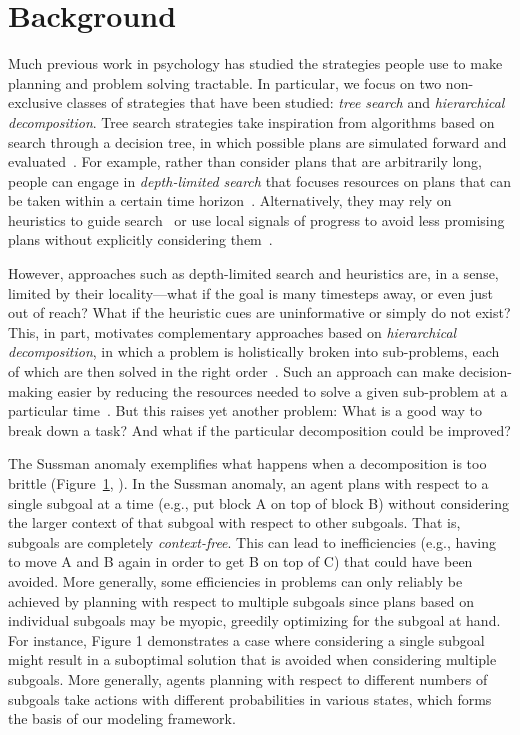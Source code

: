 \documentclass[10pt,letterpaper]{article}
\begin{document}
\section{Background}
Much previous work in psychology has studied the strategies people use to make planning and problem solving tractable. In particular, we focus on two non-exclusive classes of strategies that have been studied: \textit{tree search} and \textit{hierarchical decomposition}. Tree search strategies take inspiration from algorithms based on search through a decision tree, in which possible plans are simulated forward and evaluated~\citep{NewellSimon1972}. For example, rather than consider plans that are arbitrarily long, people can engage in \textit{depth-limited search} that focuses resources on plans that can be taken within a certain time horizon~\citep{MacGregor2001,Keramati2016,Krusche2018}. Alternatively, they may rely on heuristics to guide search~\cite[chap. 5]{Anderson1990} or use local signals of progress to avoid less promising plans without explicitly considering them~\citep{Huys2012}.

However, approaches such as depth-limited search and heuristics are, in a sense, limited by their locality---what if the goal is many timesteps away, or even just out of reach? What if the heuristic cues are uninformative or simply do not exist? This, in part, motivates complementary approaches based on \textit{hierarchical decomposition}, in which a problem is holistically broken into sub-problems, each of which are then solved in the right order~\citep{sacerdoti1974planning, botvinick2012hierarchical}. Such an approach can make decision-making easier by reducing the resources needed to solve a given sub-problem at a particular time~\citep{VanDijk2011, Maisto2015}. But this raises yet another problem: What is a good way to break down a task? And what if the particular decomposition could be improved?

The Sussman anomaly exemplifies what happens when a decomposition is too  brittle (Figure~\ref{}, \citealp{Sussman1975}). In the Sussman anomaly, an agent plans with respect to a single subgoal at a time (e.g., put block A on top of block B) without considering the larger context of that subgoal with respect to other subgoals. That is, subgoals are completely \textit{context-free}. This can lead to inefficiencies (e.g., having to move A and B again in order to get B on top of C) that could have been avoided. More generally, some efficiencies in problems can only reliably be achieved by planning with respect to multiple subgoals since plans based on individual subgoals may be myopic, greedily optimizing for the subgoal at hand. For instance, Figure 1 demonstrates a case where considering a single subgoal might result in a suboptimal solution that is avoided when considering multiple subgoals. More generally, agents planning with respect to different numbers of subgoals take actions with different probabilities in various states, which forms the basis of our modeling framework.
\end{document}
